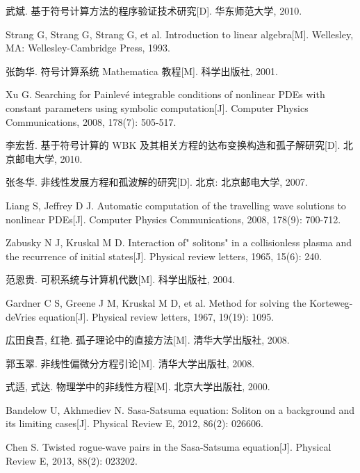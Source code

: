\cleardoublepage
{}
{}
\nocite{*}
%

\begin{thebibliography}{0}

武斌. 基于符号计算方法的程序验证技术研究[D]. 华东师范大学, 2010.

Strang G, Strang G, Strang G, et al. Introduction to linear algebra[M]. Wellesley, MA: Wellesley-Cambridge Press, 1993.

张韵华. 符号计算系统 Mathematica 教程[M]. 科学出版社, 2001.

Xu G. Searching for Painlevé integrable conditions of nonlinear PDEs with constant parameters using symbolic computation[J]. Computer Physics Communications, 2008, 178(7): 505-517.

李宏哲. 基于符号计算的 WBK 及其相关方程的达布变换构造和孤子解研究[D]. 北京邮电大学, 2010.

张冬华. 非线性发展方程和孤波解的研究[D]. 北京: 北京邮电大学, 2007.

Liang S, Jeffrey D J. Automatic computation of the travelling wave solutions to nonlinear PDEs[J]. Computer Physics Communications, 2008, 178(9): 700-712.

Zabusky N J, Kruskal M D. Interaction of" solitons" in a collisionless plasma and the recurrence of initial states[J]. Physical review letters, 1965, 15(6): 240.

范恩贵. 可积系统与计算机代数[M]. 科学出版社, 2004.

Gardner C S, Greene J M, Kruskal M D, et al. Method for solving the Korteweg-deVries equation[J]. Physical review letters, 1967, 19(19): 1095.

広田良吾, 红艳. 孤子理论中的直接方法[M]. 清华大学出版社, 2008.

郭玉翠. 非线性偏微分方程引论[M]. 清华大学出版社, 2008.

式适, 式达. 物理学中的非线性方程[M]. 北京大学出版社, 2000.

Bandelow U, Akhmediev N. Sasa-Satsuma equation: Soliton on a background and its limiting cases[J]. Physical Review E, 2012, 86(2): 026606.

Chen S. Twisted rogue-wave pairs in the Sasa-Satsuma equation[J]. Physical Review E, 2013, 88(2): 023202.


\end{thebibliography}

